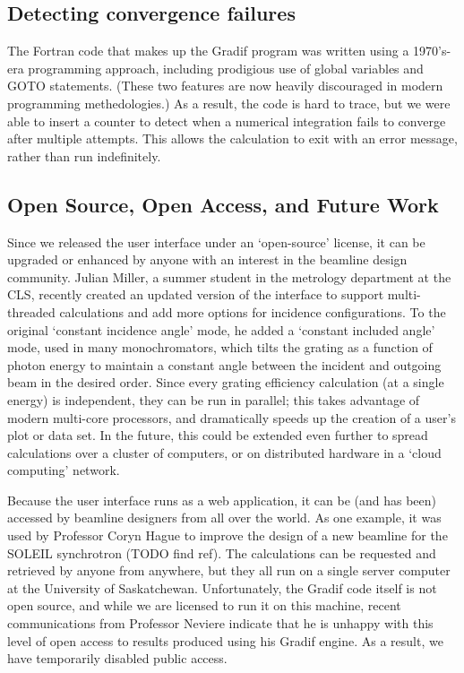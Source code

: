 \subsection{Detecting convergence failures}
The Fortran code that makes up the Gradif program was written using a 1970's-era programming approach, including prodigious use of global variables and GOTO statements.  (These two features are now heavily discouraged in modern programming methedologies.)  As a result, the code is hard to trace, but we were able to insert a counter to detect when a numerical integration fails to converge after multiple attempts.  This allows the calculation to exit with an error message, rather than run indefinitely.

\subsection{Open Source, Open Access, and Future Work}
Since we released the user interface under an `open-source' license, it can be upgraded or enhanced by anyone with an interest in the beamline design community.  Julian Miller, a summer student in the metrology department at the CLS, recently created an updated version of the interface to support multi-threaded calculations and add more options for incidence configurations.  To the original `constant incidence angle' mode, he added a `constant included angle' mode, used in many monochromators, which tilts the grating as a function of photon energy to maintain a constant angle between the incident and outgoing beam in the desired order.  Since every grating efficiency calculation (at a single energy) is independent, they can be run in parallel; this takes advantage of modern multi-core processors, and dramatically speeds up the creation of a user's plot or data set.  In the future, this could be extended even further to spread calculations over a cluster of computers, or on distributed hardware in a `cloud computing' network.

Because the user interface runs as a web application, it can be (and has been) accessed by beamline designers from all over the world.  As one example, it was used by Professor Coryn Hague to improve the design of a new beamline for the SOLEIL synchrotron (TODO find ref).  The calculations can be requested and retrieved by anyone from anywhere, but they all run on a single server computer at the University of Saskatchewan.  Unfortunately, the Gradif code itself is not open source, and while we are licensed to run it on this machine, recent communications from Professor Neviere indicate that he is unhappy with this level of open access to results produced using his Gradif engine.  As a result, we have temporarily disabled public access.

